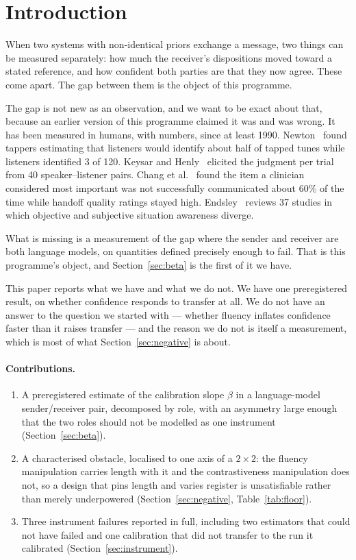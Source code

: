 \documentclass[11pt]{article}
\begin{document}
\section{Introduction}

When two systems with non-identical priors exchange a message, two things can be
measured separately: how much the receiver's dispositions moved toward a stated
reference, and how confident both parties are that they now agree. These come
apart. The gap between them is the object of this programme.

The gap is not new as an observation, and we want to be exact about that, because
an earlier version of this programme claimed it was and was wrong. It has been
measured in humans, with numbers, since at least 1990.
Newton~\cite{newton1990} found tappers estimating that listeners would identify
about half of tapped tunes while listeners identified 3 of 120.
Keysar and Henly~\cite{keysar2002} elicited the judgment per trial from 40
speaker--listener pairs. Chang et al.~\cite{chang2010} found the item a clinician
considered most important was not successfully communicated about 60\% of the
time while handoff quality ratings stayed high. Endsley~\cite{endsley2020}
reviews 37 studies in which objective and subjective situation awareness diverge.

What is missing is a measurement of the gap where the sender and receiver are
both language models, on quantities defined precisely enough to fail. That is
this programme's object, and Section~\ref{sec:beta} is the first of it we have.

This paper reports what we have and what we do not. We have one preregistered
result, on whether confidence responds to transfer at all. We do not have an
answer to the question we started with --- whether fluency inflates confidence
faster than it raises transfer --- and the reason we do not is itself a
measurement, which is most of what Section~\ref{sec:negative} is about.

\paragraph{Contributions.}
\begin{enumerate}
  \item A preregistered estimate of the calibration slope $\beta$ in a
    language-model sender/receiver pair, decomposed by role, with an asymmetry
    large enough that the two roles should not be modelled as one instrument
    (Section~\ref{sec:beta}).
  \item A characterised obstacle, localised to one axis of a $2\times2$: the
    fluency manipulation carries length with it and the contrastiveness
    manipulation does not, so a design that pins length and varies register is
    unsatisfiable rather than merely underpowered
    (Section~\ref{sec:negative}, Table~\ref{tab:floor}).
  \item Three instrument failures reported in full, including two estimators
    that could not have failed and one calibration that did not transfer to the
    run it calibrated (Section~\ref{sec:instrument}).
\end{enumerate}
\end{document}
